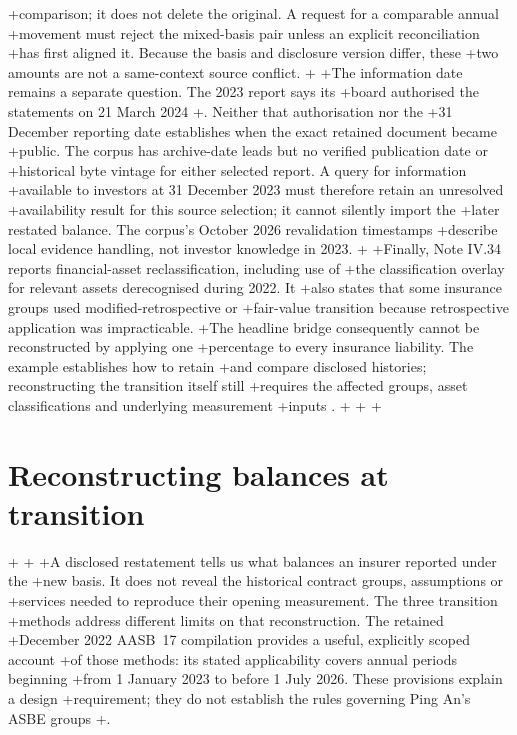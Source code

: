 +comparison; it does not delete the original. A request for a comparable annual
+movement must reject the mixed-basis pair unless an explicit reconciliation
+has first aligned it. Because the basis and disclosure version differ, these
+two amounts are not a same-context source conflict.
+
+The information date remains a separate question. The 2023 report says its
+board authorised the statements on 21 March 2024
+\citep[Note I, p.~154]{pingan2023asbe}. Neither that authorisation nor the
+31 December reporting date establishes when the exact retained document became
+public. The corpus has archive-date leads but no verified publication date or
+historical byte vintage for either selected report. A query for information
+available to investors at 31 December 2023 must therefore retain an unresolved
+availability result for this source selection; it cannot silently import the
+later restated balance. The corpus's October 2026 revalidation timestamps
+describe local evidence handling, not investor knowledge in 2023.
+
+Finally, Note IV.34 reports financial-asset reclassification, including use of
+the classification overlay for relevant assets derecognised during 2022. It
+also states that some insurance groups used modified-retrospective or
+fair-value transition because retrospective application was impracticable.
+The headline bridge consequently cannot be reconstructed by applying one
+percentage to every insurance liability. The example establishes how to retain
+and compare disclosed histories; reconstructing the transition itself still
+requires the affected groups, asset classifications and underlying measurement
+inputs \citep[Note IV.34, p.~192]{pingan2023asbe}.
+
+\clearpage
+\section{Reconstructing balances at transition}
+\label{sec:insurance-transition}
+
+A disclosed restatement tells us what balances an insurer reported under the
+new basis. It does not reveal the historical contract groups, assumptions or
+services needed to reproduce their opening measurement. The three transition
+methods address different limits on that reconstruction. The retained
+December 2022 AASB~17 compilation provides a useful, explicitly scoped account
+of those methods: its stated applicability covers annual periods beginning
+from 1 January 2023 to before 1 July 2026. These provisions explain a design
+requirement; they do not establish the rules governing Ping An's ASBE groups
+\citep[Appendix C]{aasb17}.
